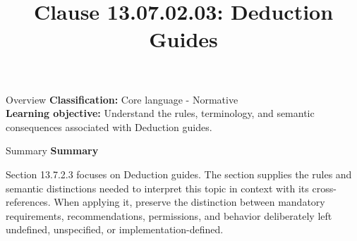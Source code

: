 \documentclass[10pt,letterpaper]{article}
\title{Clause 13.07.02.03: Deduction Guides}
\author{}
\date{}
\begin{document}
\maketitle
\begin{CornellOverviewBox}{Overview}
\textbf{Classification:} Core language - Normative\\[2pt]
\textbf{Learning objective:} Understand the rules, terminology, and semantic consequences associated with Deduction guides.
\end{CornellOverviewBox}\begin{CornellSummaryBox}{Summary}
{\sffamily\bfseries\color{Accent} Summary}\par\vspace{3pt}Section 13.7.2.3 focuses on Deduction guides. The section supplies the rules and semantic distinctions needed to interpret this topic in context with its cross-references. When applying it, preserve the distinction between mandatory requirements, recommendations, permissions, and behavior deliberately left undefined, unspecified, or implementation-defined.
\end{CornellSummaryBox}
\end{document}
